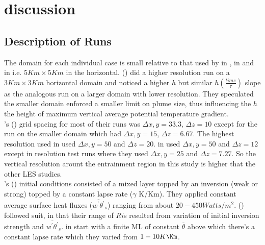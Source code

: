 
\chapter{discussion}
\label{ch:results}
\setlength{\parindent}{0cm}

\section{Description of Runs}
\FloatBarrier

The domain for each individual case is small relative to that used by \citeauthor{SullMoengStev} in \cite{SullMoengStev}, \citeauthor{FedConzMir04} in \cite{FedConzMir04} and \citeauthor{BrooksFowler2} in \cite{BrooksFowler2} i.e. $5Km \times 5 Km$ in the horizontal.  \citeauthor{SullMoengStev} (\cite{SullMoengStev}) did a higher resolution run on a $3 Km \times 3 Km$ horizontal domain and noticed a higher $h$ but similar $h(\frac{time}{\tau})$ slope as the analogous run on a larger domain with lower resolution.  They speculated the smaller domain enforced a smaller limit on plume size, thus influencing the $h$ the height of maximum vertical average potential temperature gradient.\\

\citeauthor{SullMoengStev}'s (\cite{SullMoengStev}) grid spacing for most of their runs was $\Delta x, y= 33.3$, $\Delta z=10$ except for the run on the smaller domain which had $\Delta x, y = 15$, $\Delta z=6.67$.  The highest resolution \citeauthor{FedConzMir04} used in \cite{FedConzMir04} used $\Delta x, y = 50$ and $\Delta z = 20$.  \cite{BrooksFowler2} in \cite{BrooksFowler2} used $\Delta x, y = 50$ and $\Delta z = 12$ except in resolution test runs where they used $\Delta x, y = 25$ and $\Delta z = 7.27$.  So the vertical resolution arount the entrainment region in this study is higher that the other LES studies.\\          

\citeauthor{SullMoengStev}'s (\cite{SullMoengStev}) initial conditions consisted of a mixed layer topped by an inversion (weak or strong) topped by a constant lapse rate ($\gamma$  K/Km). They applied constant average surface heat fluxes ($\overline{w^{'}\theta^{'}}_{s}$) ranging from about $20 - 450 Watts/m^{2}$. \citeauthor{BrooksFowler2} (\cite{BrooksFowler2}) followed suit, in that their range of $Ri$s resulted from variation of initial inversion strength and $\overline{w^{'}\theta^{'}}_{s}$.  \citeauthor{FedConzMir04} in \cite{FedConzMir04} start with a finite \acs{ML} of constant $\overline{\theta}$ above which there's a constant lapse rate which they varied from  $1 - 10 K\Km$.\\ 

